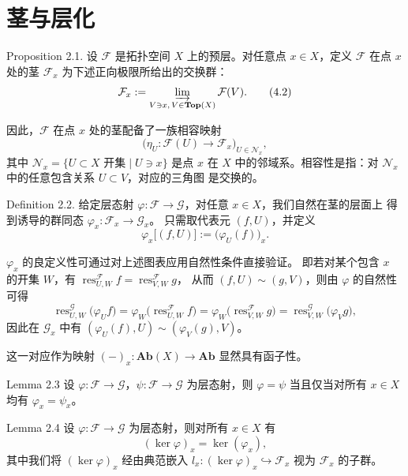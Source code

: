 \documentclass{beamer}
\begin{document}
\section{茎与层化}
\begin{frame}
\begin{block}{Proposition 2.1.}
设 $\mathcal{F}$ 是拓扑空间 $X$ 上的预层。对任意点 $x \in X$，定义 $\mathcal{F}$ 在点 $x$ 处的茎 $\mathcal{F}_x$ 为下述正向极限所给出的交换群：
\[
\mathcal{F}_x := \varinjlim_{\substack{V \ni x,\, V \in \mathbf{Top}(X)}} \mathcal{F}(V). \tag{4.2}
\]

因此，$\mathcal{F}$ 在点 $x$ 处的茎配备了一族相容映射
\[
\bigl(\eta_U: \mathcal{F}(U) \to \mathcal{F}_x\bigr)_{U \in \mathcal{N}_x},
\]
其中 $\mathcal{N}_x = \{U \subset X \text{ 开集} \mid U \ni x\}$ 是点 $x$ 在 $X$ 中的邻域系。相容性是指：对 $\mathcal{N}_x$ 中的任意包含关系 $U \subset V$，对应的三角图
是交换的。


\end{block}
\end{frame}

\begin{frame}
\begin{block}{Definition 2.2.}
给定层态射 $\varphi: \mathcal{F} \to \mathcal{G}$，对任意 $x \in X$，我们自然在茎的层面上
得到诱导的群同态 $\varphi_x: \mathcal{F}_x \to \mathcal{G}_x$。
只需取代表元 $(f, U)$，并定义
\[
\varphi_x\bigl[(f, U)\bigr] := \bigl(\varphi_U(f)\bigr)_x.
\]

$\varphi_x$ 的良定义性可通过对上述图表应用自然性条件直接验证。
即若对某个包含 $x$ 的开集 $W$，有
$\operatorname{res}_{U,W}^{\mathcal{F}} f = \operatorname{res}_{V,W}^{\mathcal{F}} g$，
从而 $(f, U) \sim (g, V)$，则由 $\varphi$ 的自然性可得
\[
\operatorname{res}_{U,W}^{\mathcal{G}}\bigl(\varphi_U f\bigr)
= \varphi_W\bigl(\operatorname{res}_{U,W}^{\mathcal{F}} f\bigr)
= \varphi_W\bigl(\operatorname{res}_{V,W}^{\mathcal{F}} g\bigr)
= \operatorname{res}_{V,W}^{\mathcal{G}}\bigl(\varphi_V g\bigr),
\]
因此在 $\mathcal{G}_x$ 中有 $(\varphi_U(f), U) \sim (\varphi_V(g), V)$。

这一对应作为映射
$(-)_x: \mathbf{Ab}(X) \to \mathbf{Ab}$
显然具有函子性。
\end{block}
\end{frame}


\begin{frame}
\begin{block}{Lemma 2.3}
设 $\varphi: \mathcal{F} \to \mathcal{G}$，$\psi: \mathcal{F} \to \mathcal{G}$ 为层态射，则
$\varphi = \psi$ 当且仅当对所有 $x \in X$ 均有 $\varphi_x = \psi_x$。
\end{block}
\begin{block}{Lemma 2.4}
设 $\varphi: \mathcal{F} \to \mathcal{G}$ 为层态射，则对所有 $x \in X$ 有
\[
(\ker \varphi)_{x} = \ker(\varphi_{x}),
\]
其中我们将 $(\ker \varphi)_{x}$ 经由典范嵌入 $l_{x}: (\ker \varphi)_{x} \hookrightarrow \mathcal{F}_{x}$ 视为 $\mathcal{F}_{x}$ 的子群。

\end{block}
\end{frame}
\end{document}

